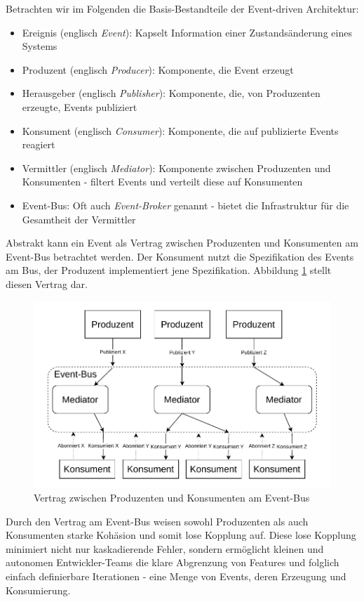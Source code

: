 \documentclass[acmtog]{acmart}
\begin{document}
Betrachten wir im Folgenden die Basis-Bestandteile der Event-driven Architektur:
\begin{itemize}
  \item Ereignis (englisch \textit{Event}): Kapselt Information einer Zustandsänderung eines Systems
  \item Produzent (englisch \textit{Producer}): Komponente, die Event erzeugt
  \item Herausgeber (englisch \textit{Publisher}): Komponente, die, von Produzenten erzeugte, Events publiziert
  \item Konsument (englisch \textit{Consumer}): Komponente, die auf publizierte Events reagiert
  \item Vermittler (englisch \textit{Mediator}): Komponente zwischen Produzenten und Konsumenten - filtert Events und verteilt diese auf Konsumenten
  \item Event-Bus: Oft auch \textit{Event-Broker} genannt - bietet die Infrastruktur für die Gesamtheit der Vermittler
\end{itemize}
Abstrakt kann ein Event als Vertrag zwischen Produzenten und Konsumenten am Event-Bus betrachtet werden.
Der Konsument nutzt die Spezifikation des Events am Bus, der Produzent implementiert jene Spezifikation.
Abbildung \ref{fig:eda} stellt diesen Vertrag dar.

\begin{figure}[!h]
  \centering
  \includegraphics[width=\linewidth]{images/eda/eda.drawio}
  \caption{Vertrag zwischen Produzenten und Konsumenten am Event-Bus}
  \label{fig:eda}
\end{figure}

Durch den Vertrag am Event-Bus weisen sowohl Produzenten als auch Konsumenten starke Kohäsion und somit lose Kopplung auf.
Diese lose Kopplung minimiert nicht nur kaskadierende Fehler, sondern ermöglicht kleinen und autonomen Entwickler-Teams
die klare Abgrenzung von Features und folglich einfach definierbare Iterationen - eine Menge von Events, deren Erzeugung und Konsumierung.
\end{document}
